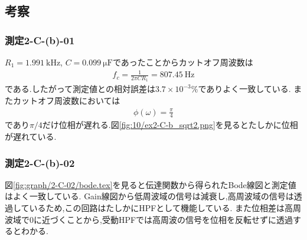 \subsection{考察}
\subsubsection{測定2-C-(b)-01}
$R_1=1.991\ \si{\kilo\hertz}$, $C=0.099\ \si{\micro\farad}$であったことからカットオフ周波数は
\begin{align}
  f_c=\frac{1}{2\pi CR_1}=807.45\ \si{\hertz}
\end{align}
である.したがって測定値との相対誤差は$3.7\times10^{-3}\%$でありよく一致している.
またカットオフ周波数においては
\begin{align}
  \phi(\omega)=\frac{\pi}{4}
\end{align}
であり$\pi/4$だけ位相が遅れる.図\ref{fig:10/ex2-C-b_sqrt2.png}を見るとたしかに位相が遅れている.
\subsubsection{測定2-C-(b)-02}
図\ref{fig:graph/2-C-02/bode.tex}を見ると伝達関数から得られたBode線図と測定値はよく一致している.
Gain線図から低周波域の信号は減衰し,高周波域の信号は透過しているため,この回路はたしかにHPFとして機能している.
また位相差は高周波域で0に近づくことから,受動HPFでは高周波の信号を位相を反転せずに透過するとわかる.